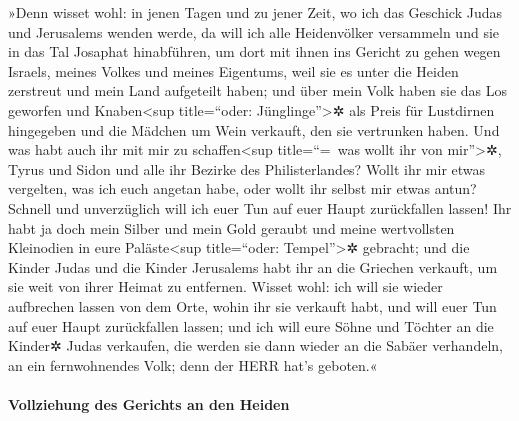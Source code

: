 »Denn wisset wohl: in jenen Tagen und zu jener Zeit, wo
ich das Geschick Judas und Jerusalems wenden werde, da
will ich alle Heidenvölker versammeln und sie in das Tal Josaphat
hinabführen, um dort mit ihnen ins Gericht zu gehen wegen Israels,
meines Volkes und meines Eigentums, weil sie es unter die Heiden
zerstreut und mein Land aufgeteilt haben; und über mein
Volk haben sie das Los geworfen und Knaben\textless sup title=``oder:
Jünglinge''\textgreater✲ als Preis für Lustdirnen hingegeben und die
Mädchen um Wein verkauft, den sie vertrunken haben. Und
was habt auch ihr mit mir zu schaffen\textless sup title=``=~was wollt
ihr von mir''\textgreater✲, Tyrus und Sidon und alle ihr Bezirke des
Philisterlandes? Wollt ihr mir etwas vergelten, was ich euch angetan
habe, oder wollt ihr selbst mir etwas antun? Schnell und unverzüglich
will ich euer Tun auf euer Haupt zurückfallen lassen! Ihr
habt ja doch mein Silber und mein Gold geraubt und meine wertvollsten
Kleinodien in eure Paläste\textless sup title=``oder:
Tempel''\textgreater✲ gebracht; und die Kinder Judas und
die Kinder Jerusalems habt ihr an die Griechen verkauft, um sie weit von
ihrer Heimat zu entfernen. Wisset wohl: ich will sie
wieder aufbrechen lassen von dem Orte, wohin ihr sie verkauft habt, und
will euer Tun auf euer Haupt zurückfallen lassen; und ich
will eure Söhne und Töchter an die Kinder✲ Judas verkaufen, die werden
sie dann wieder an die Sabäer verhandeln, an ein fernwohnendes Volk;
denn der HERR hat's geboten.«

\hypertarget{vollziehung-des-gerichts-an-den-heiden}{%
\paragraph{Vollziehung des Gerichts an den
Heiden}\label{vollziehung-des-gerichts-an-den-heiden}}

